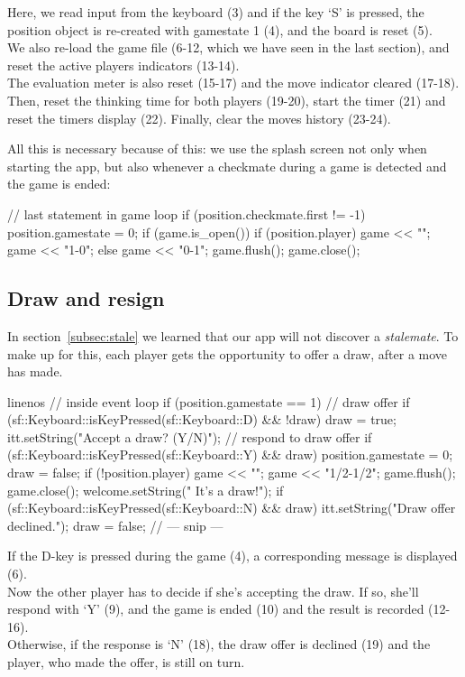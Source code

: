 Here, we read input from the keyboard (3) and if the key `S' is pressed, the position object
is re-created with gamestate 1 (4), and the board is reset (5).\\
We also re-load the game file (6-12, which we have seen in the last section),
and reset the active players indicators (13-14).\\
The evaluation meter is also reset (15-17) and the move indicator cleared (17-18).\\
Then, reset the thinking time for both players (19-20), start the timer (21) and
reset the timers display (22).
Finally, clear the moves history (23-24).

All this is necessary because of this: we use the splash screen not only when starting the app,
but also whenever a checkmate during a game is detected and the game is ended:

\begin{cpp}
// last statement in game loop
if (position.checkmate.first != -1) {
  position.gamestate = 0;
  if (game.is_open()) {
    if (position.player) {
      game << "\n";
      game << "1-0\n";
    }
    else game << "0-1\n";
    game.flush();
    game.close();
  }
}
\end{cpp}

\subsection{Draw and resign}

In section~\ref{subsec:stale} we learned that our app will not discover a \emph{stalemate}.
To make up for this, each player gets the opportunity to offer a draw, after a move has made.

\begin{cpp*}{linenos}
// inside event loop
if (position.gamestate == 1) {
  // draw offer
  if (sf::Keyboard::isKeyPressed(sf::Keyboard::D) && !draw) {
    draw = true;
    itt.setString("Accept a draw? (Y/N)");
  }
  // respond to draw offer
  if (sf::Keyboard::isKeyPressed(sf::Keyboard::Y) && draw) {
    position.gamestate = 0;
    draw = false;
    if (!position.player) game << "\n";
    game << "1/2-1/2\n";
    game.flush();
    game.close();
    welcome.setString("     It's a draw!");
  }
  if (sf::Keyboard::isKeyPressed(sf::Keyboard::N) && draw) {
    itt.setString("Draw offer declined.");
    draw = false;
  }
  // --- snip ---
}
\end{cpp*}

If the D-key is pressed during the game (4), a corresponding message is displayed (6).\\
Now the other player has to decide if she's accepting the draw.
If so, she'll respond with `Y' (9), and the game is ended (10) and the result is recorded (12-16).\\
Otherwise, if the response is `N' (18), the draw offer is declined (19) and the player, who
made the offer, is still on turn.

